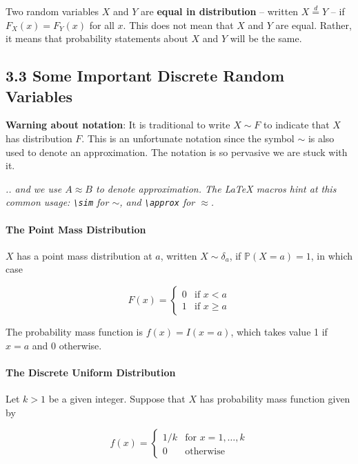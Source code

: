 Two random variables \(X\) and \(Y\) are \textbf{equal in distribution}
-- written \(X \overset{d}= Y\) -- if \(F_X(x) = F_Y(x)\) for all \(x\).
This does not mean that \(X\) and \(Y\) are equal. Rather, it means that
probability statements about \(X\) and \(Y\) will be the same.

\subsection{3.3 Some Important Discrete Random
Variables}\label{some-important-discrete-random-variables}

\textbf{Warning about notation}: It is traditional to write \(X \sim F\)
to indicate that \(X\) has distribution \(F\). This is an unfortunate
notation since the symbol \(\sim\) is also used to denote an
approximation. The notation is so pervasive we are stuck with it.

\emph{.. and we use \(A \approx B\) to denote approximation. The LaTeX
macros hint at this common usage: \texttt{\textbackslash{}sim} for
\(\sim\), and \texttt{\textbackslash{}approx} for \(\approx\).}

\paragraph{The Point Mass
Distribution}\label{the-point-mass-distribution}

\(X\) has a point mass distribution at \(a\), written
\(X \sim \delta_a\), if \(\mathbb{P}(X = a) = 1\), in which case

\[ F(x) = \begin{cases}
0 &\text{if } x < a \\
1 &\text{if } x \geq a
\end{cases} \]

The probability mass function is \(f(x) = I(x = a)\), which takes value
1 if \(x = a\) and 0 otherwise.

\paragraph{The Discrete Uniform
Distribution}\label{the-discrete-uniform-distribution}

Let \(k > 1\) be a given integer. Suppose that \(X\) has probability
mass function given by

\[ f(x) = \begin{cases}
1/k &\text{for } x = 1, \dots, k \\
0 &\text{otherwise}
\end{cases} \]

